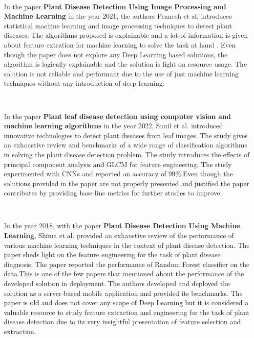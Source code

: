 \

In the paper \textbf{Plant Disease Detection Using Image Processing and Machine Learning} in the year 2021, the authors Pranesh et al. introduces statistical machine learning and image processing techniques to detect plant diseases. The algorithms proposed is explainable and a lot of information is given about feature extration for machine learning to solve the task at hand \cite{kulkarni2021plant}. Even though the paper does not explore any Deep Learning based solutions, the algorithm is logically explainable and the solution is light on resource usage. The solution is not reliable and performant due to the use of just machine learning techniques without any introduction of deep learning. 

\

In the paper \textbf{Plant leaf disease detection using computer vision and machine learning algorithms} in the year 2022, Sunil et al. introduced innovative technologies to detect plant diseases from leaf images. The study gives an exhaustive review and benchmarks of a wide range of classification algorithms in solving the plant disease detection problem. The study introduces the effects of principal component analysis and GLCM for feature engineering. The study experimented with CNNs and reported an accuracy of 99\%\cite{harakannanavar2022plant}.Even though the solutions provided in the paper are not properly presented and justified the paper contributes by providing base line metrics for further studies to improve.

\

In the year 2018, with the paper \textbf{Plant Disease Detection Using Machine Learning}, Shima et al. provided an exhaustive review of the performance of various machine learning techniques in the context of plant disease detection. The paper sheds light on the feature engineering for the task of plant disease diagnosis. The paper reported the performance of Random Forest classifier on the data\cite{ramesh2018plant}.This is one of the few papers that mentioned about the performance of the developed solution in deployment. The authors developed and deployed the solution as a server-based mobile application and provided its benchmarks. The paper is old and does not cover any scope of Deep Learning but it is considered a valuable resource to study feature extraction and engineering for the task of plant disease detection due to its very insightful presentation of feature selection and extraction.

\

